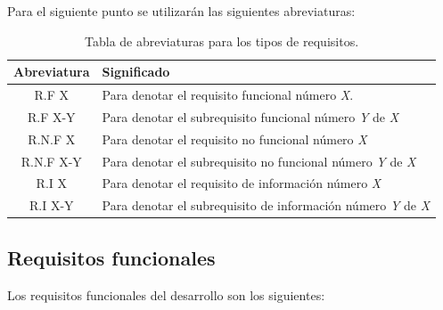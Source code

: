 Para el siguiente punto se utilizarán las siguientes abreviaturas:\\  
\begin{table}[H]
   \centering
   \label{tabla-abreviaturas}
   \begin{tabular}{|c|l|}
   \hline
   \textbf{Abreviatura} & \textbf{Significado} \\ \hline
   R.F X       & Para denotar el requisito funcional número \textit{X}.\\ \hline
   R.F X-Y     & Para denotar el subrequisito funcional número \textit{Y} de \textit{X}\\ \hline
   R.N.F X     & Para denotar el requisito no funcional número \textit{X}\\ \hline
   R.N.F X-Y   & Para denotar el subrequisito no funcional número \textit{Y} de \textit{X}\\ \hline
   R.I X       & Para denotar el requisito de información número \textit{X}\\ \hline
   R.I X-Y     & Para denotar el subrequisito de información número \textit{Y} de \textit{X}\\ \hline
   \end{tabular}
   \caption{Tabla de abreviaturas para los tipos de requisitos.}
\end{table}


\subsection{Requisitos funcionales}
Los requisitos funcionales del desarrollo son los siguientes: 

